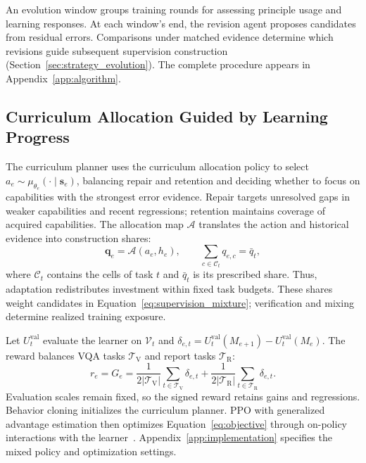 An evolution window groups training rounds for assessing principle usage and learning responses. At each window's end, the revision agent proposes candidates from residual errors. Comparisons under matched evidence determine which revisions guide subsequent supervision construction (Section~\ref{sec:strategy_evolution}). The complete procedure appears in Appendix~\ref{app:algorithm}.

\subsection{Curriculum Allocation Guided by Learning Progress}
\label{sec:curriculum}

The curriculum planner uses the curriculum allocation policy to select $a_e\sim\mu_{\theta_e}(\cdot\mid \mathbf{s}_e)$, balancing repair and retention and deciding whether to focus on capabilities with the strongest error evidence. Repair targets unresolved gaps in weaker capabilities and recent regressions; retention maintains coverage of acquired capabilities. The allocation map $\mathcal A$ translates the action and historical evidence into construction shares:
\begin{equation}
\boldsymbol q_e=\mathcal A(a_e,h_e),\qquad
\sum_{c\in\mathcal C_t}q_{e,c}=\bar q_t,
\label{eq:quota}
\end{equation}
where $\mathcal C_t$ contains the cells of task $t$ and $\bar q_t$ is its prescribed share. Thus, adaptation redistributes investment within fixed task budgets. These shares weight candidates in Equation~\ref{eq:supervision_mixture}; verification and mixing determine realized training exposure.

Let $U_t^{\mathrm{val}}$ evaluate the learner on $\mathcal V_t$ and $\delta_{e,t}=U_t^{\mathrm{val}}(M_{e+1})-U_t^{\mathrm{val}}(M_e)$. The reward balances VQA tasks $\mathcal T_{\mathrm V}$ and report tasks $\mathcal T_{\mathrm R}$:
\begin{equation}
r_e=G_e=\frac{1}{2|\mathcal T_{\mathrm V}|}\sum_{t\in\mathcal T_{\mathrm V}}\delta_{e,t}
+\frac{1}{2|\mathcal T_{\mathrm R}|}\sum_{t\in\mathcal T_{\mathrm R}}\delta_{e,t}.
\label{eq:gain}
\end{equation}
Evaluation scales remain fixed, so the signed reward retains gains and regressions. Behavior cloning initializes the curriculum planner. PPO with generalized advantage estimation then optimizes Equation~\ref{eq:objective} through on-policy interactions with the learner~\citep{schulman2017proximal,schulman2016high}. Appendix~\ref{app:implementation} specifies the mixed policy and optimization settings.

